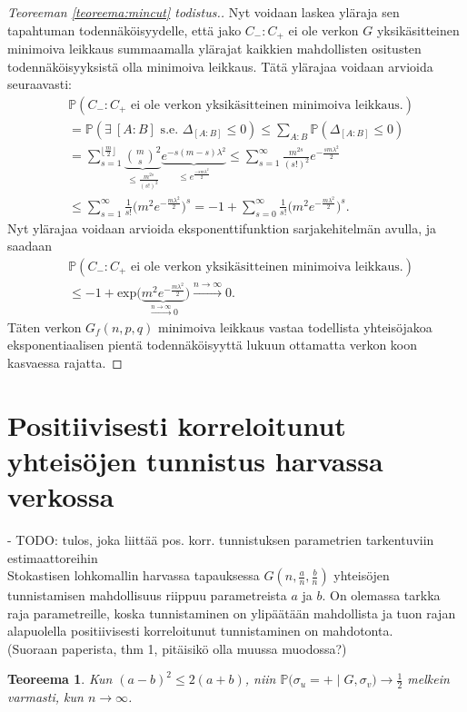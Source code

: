 \documentclass[finnish,12pt,a4paper,pdftex,sci,utf8]{aaltothesis}
\newcommand\floor[1]{\lfloor#1\rfloor}
\newtheorem{teoreema}{Teoreema}
\begin{document}
\begin{proof}[Teoreeman \ref{teoreema:mincut} todistus.]
Nyt voidaan laskea yläraja sen tapahtuman todennäköisyydelle, että jako $C_-:C_+$ ei ole verkon $G$ yksikäsitteinen minimoiva leikkaus summaamalla ylärajat kaikkien mahdollisten ositusten todennäköisyyksistä olla minimoiva leikkaus. Tätä ylärajaa voidaan arvioida seuraavasti:
\begin{align*}
	&\mathbb{P}(C_-:C_+ \text{ ei ole verkon yksikäsitteinen minimoiva leikkaus.}) \\
	&= \mathbb{P}(\exists \ [ A:B ] \text { s.e. } \Delta_{ [A:B] } \leq 0) \leq \sum_{A:B}^{}\mathbb{P}( \Delta_{ [A:B] } \leq 0) \\
	&= \sum_{s=1}^{\floor{\frac{m}{2}}} \underbrace{\binom{m}{s}^2}_{\leq \frac{m^{2s}}{(s!)^2}} \underbrace{e^{-s(m-s)\lambda^2}}_{ \leq e^{ \frac{-sm \lambda^2  }{2}}} \leq \sum_{s=1}^{\infty} \frac{m^{2s}}{(s!)^2} e^{-\frac{sm \lambda^2}{2}} \\
	&\leq \sum_{s=1}^{\infty} \frac{1}{s!} \big( m^{2}e^{-\frac{m \lambda^2}{2}} \big)^s = -1 + \sum_{s=0}^{\infty} \frac{1}{s!} \big( m^{2}e^{-\frac{m \lambda^2}{2}} \big)^s.
\end{align*}
Nyt ylärajaa voidaan arvioida eksponenttifunktion sarjakehitelmän avulla, ja saadaan
\begin{align*}
	&\mathbb{P}(C_-:C_+ \text{ ei ole verkon yksikäsitteinen minimoiva leikkaus.}) \\
	&\leq -1 + \text{exp}\big(\underbrace{m^2  e^{-\frac{m \lambda^2}{2} }}_{\xrightarrow{n \rightarrow \infty} 0} \big) \xrightarrow{n \rightarrow \infty} 0.
\end{align*}
Täten verkon $G_f(n,p,q)$ minimoiva leikkaus vastaa todellista yhteisöjakoa eksponentiaalisen pientä todennäköisyyttä lukuun ottamatta verkon koon kasvaessa rajatta.
\end{proof}

\clearpage
\section{Positiivisesti korreloitunut yhteisöjen tunnistus harvassa verkossa}
- TODO: tulos, joka liittää pos. korr. tunnistuksen parametrien tarkentuviin estimaattoreihin \\

Stokastisen lohkomallin harvassa tapauksessa $G(n,\frac{a}{n}, \frac{b}{n})$ yhteisöjen tunnistamisen mahdollisuus riippuu parametreista $a$ ja $b$. On olemassa tarkka raja parametreille, koska tunnistaminen on ylipäätään mahdollista ja tuon rajan alapuolella positiivisesti korreloitunut tunnistaminen on mahdotonta. \\
(Suoraan paperista, thm 1, pitäisikö olla muussa muodossa?)
\begin{teoreema}
	\label{teoreema:mahdottomuus}
	Kun $(a-b)^2 \leq 2(a+b)$, niin $\mathbb{P}\big( \sigma_u = + \mid G, \sigma_v \big) \rightarrow \frac{1}{2}$ melkein varmasti, kun $n \rightarrow \infty$. 
\end{teoreema}
\end{document}
